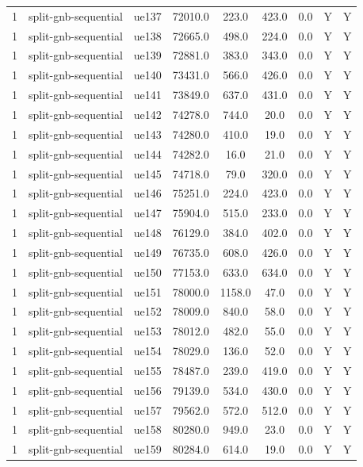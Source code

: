 \begin{table}[ht]
\begin{tabular}{|c|c|c|c|c|c|c|c|c|}
1 & split-gnb-sequential & ue137 & 72010.0 & 223.0 & 423.0 & 0.0 & Y & Y \\
1 & split-gnb-sequential & ue138 & 72665.0 & 498.0 & 224.0 & 0.0 & Y & Y \\
1 & split-gnb-sequential & ue139 & 72881.0 & 383.0 & 343.0 & 0.0 & Y & Y \\
1 & split-gnb-sequential & ue140 & 73431.0 & 566.0 & 426.0 & 0.0 & Y & Y \\
1 & split-gnb-sequential & ue141 & 73849.0 & 637.0 & 431.0 & 0.0 & Y & Y \\
1 & split-gnb-sequential & ue142 & 74278.0 & 744.0 & 20.0 & 0.0 & Y & Y \\
1 & split-gnb-sequential & ue143 & 74280.0 & 410.0 & 19.0 & 0.0 & Y & Y \\
1 & split-gnb-sequential & ue144 & 74282.0 & 16.0 & 21.0 & 0.0 & Y & Y \\
1 & split-gnb-sequential & ue145 & 74718.0 & 79.0 & 320.0 & 0.0 & Y & Y \\
1 & split-gnb-sequential & ue146 & 75251.0 & 224.0 & 423.0 & 0.0 & Y & Y \\
1 & split-gnb-sequential & ue147 & 75904.0 & 515.0 & 233.0 & 0.0 & Y & Y \\
1 & split-gnb-sequential & ue148 & 76129.0 & 384.0 & 402.0 & 0.0 & Y & Y \\
1 & split-gnb-sequential & ue149 & 76735.0 & 608.0 & 426.0 & 0.0 & Y & Y \\
1 & split-gnb-sequential & ue150 & 77153.0 & 633.0 & 634.0 & 0.0 & Y & Y \\
1 & split-gnb-sequential & ue151 & 78000.0 & 1158.0 & 47.0 & 0.0 & Y & Y \\
1 & split-gnb-sequential & ue152 & 78009.0 & 840.0 & 58.0 & 0.0 & Y & Y \\
1 & split-gnb-sequential & ue153 & 78012.0 & 482.0 & 55.0 & 0.0 & Y & Y \\
1 & split-gnb-sequential & ue154 & 78029.0 & 136.0 & 52.0 & 0.0 & Y & Y \\
1 & split-gnb-sequential & ue155 & 78487.0 & 239.0 & 419.0 & 0.0 & Y & Y \\
1 & split-gnb-sequential & ue156 & 79139.0 & 534.0 & 430.0 & 0.0 & Y & Y \\
1 & split-gnb-sequential & ue157 & 79562.0 & 572.0 & 512.0 & 0.0 & Y & Y \\
1 & split-gnb-sequential & ue158 & 80280.0 & 949.0 & 23.0 & 0.0 & Y & Y \\
1 & split-gnb-sequential & ue159 & 80284.0 & 614.0 & 19.0 & 0.0 & Y & Y \\

\end{tabular}
\end{table}
